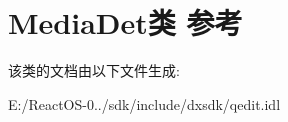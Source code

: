 \hypertarget{class_media_det}{}\section{Media\+Det类 参考}
\label{class_media_det}


该类的文档由以下文件生成\+:\begin{DoxyCompactItemize}
\item 
E\+:/\+React\+O\+S-\/0../sdk/include/dxsdk/qedit.\+idl\end{DoxyCompactItemize}
